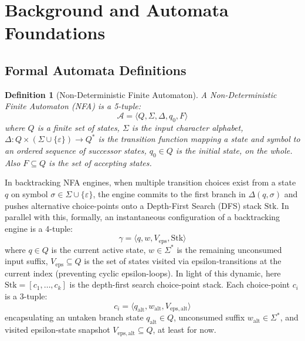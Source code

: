 \documentclass{ieeeaccess}
\newtheorem{definition}{Definition}
\begin{document}
\section{Background and Automata Foundations}\label{sec:background}

\subsection{Formal Automata Definitions}

\begin{definition}[Non-Deterministic Finite Automaton]\label{def:nfa}
A Non-Deterministic Finite Automaton (NFA) is a 5-tuple:
\begin{equation}\label{eq:nfa_tuple}
\mathcal{A} = \langle Q, \Sigma, \Delta, q_0, F \rangle
\end{equation}
where $Q$ is a finite set of states, $\Sigma$ is the input character alphabet, $\Delta: Q \times (\Sigma \cup \{\varepsilon\}) \to Q^*$ is the transition function mapping a state and symbol to an ordered sequence of successor states, $q_0 \in Q$ is the initial state, on the whole. Also $F \subseteq Q$ is the set of accepting states.
\end{definition}

In backtracking NFA engines, when multiple transition choices exist from a state $q$ on symbol $\sigma \in \Sigma \cup \{\varepsilon\}$, the engine commits to the first branch in $\Delta(q, \sigma)$ and pushes alternative choice-points onto a Depth-First Search (DFS) stack $\mathrm{Stk}$. In parallel with this, formally, an instantaneous configuration of a backtracking engine is a 4-tuple:
\begin{equation}\label{eq:engine_config}
\gamma = \langle q, w, V_{\mathrm{eps}}, \mathrm{Stk} \rangle
\end{equation}
where $q \in Q$ is the current active state, $w \in \Sigma^*$ is the remaining unconsumed input suffix, $V_{\mathrm{eps}} \subseteq Q$ is the set of states visited via epsilon-transitions at the current index (preventing cyclic epsilon-loops). In light of this dynamic, here $\mathrm{Stk} = [c_1, \dots, c_k]$ is the depth-first search choice-point stack. Each choice-point $c_i$ is a 3-tuple:
\begin{equation}\label{eq:choice_point}
c_i = \langle q_{\mathrm{alt}}, w_{\mathrm{alt}}, V_{\mathrm{eps,alt}} \rangle
\end{equation}
encapsulating an untaken branch state $q_{\mathrm{alt}} \in Q$, unconsumed suffix $w_{\mathrm{alt}} \in \Sigma^*$, and visited epsilon-state snapshot $V_{\mathrm{eps,alt}} \subseteq Q$, at least for now.
\end{document}
